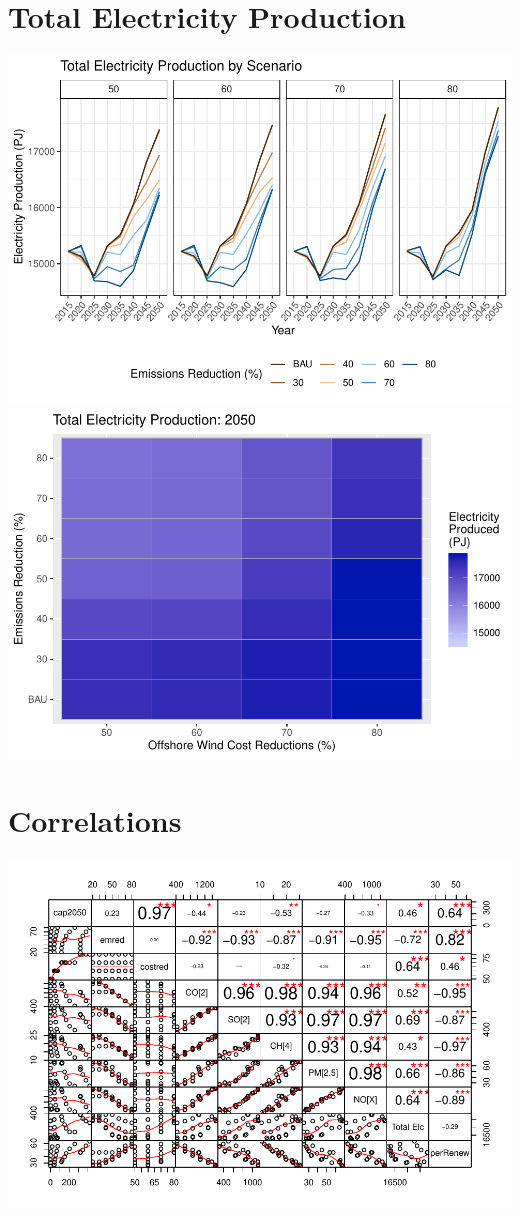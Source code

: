\documentclass[]{article}
\begin{document}
\hypertarget{total-electricity-production}{%
\section{Total Electricity
Production}\label{total-electricity-production}}

\includegraphics[width=0.5\linewidth]{osw_Report_files/figure-latex/unnamed-chunk-64-1}
\includegraphics[width=0.5\linewidth]{osw_Report_files/figure-latex/unnamed-chunk-64-2}

\hypertarget{correlations}{%
\section{Correlations}\label{correlations}}

\includegraphics{osw_Report_files/figure-latex/unnamed-chunk-65-1.pdf}
\end{document}
